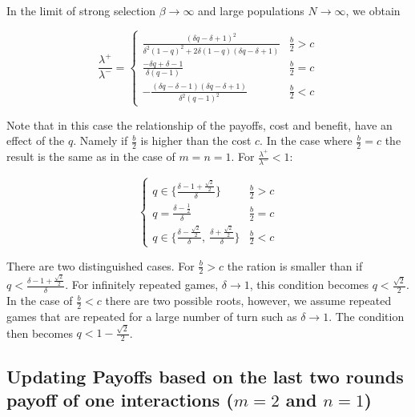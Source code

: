 \documentclass[11pt]{article}
\theoremstyle{plainCl1}
\theoremstyle{plainCl2}
\begin{document}
In the limit of strong selection \(\beta \rightarrow \infty\) and large
populations \(N \rightarrow \infty \), we obtain

\begin{equation}
\frac{\lambda^{+}}{\lambda^{-}} = 
\begin{cases}
  \frac{\left(\delta q - \delta + 1\right)^{2}}{\delta^{2} \left(1 - q\right)^{2} + 2 \delta \left(1 - q\right) \left(\delta q - \delta + 1\right)}  & \frac{b}{2} > c \\
  \frac{- \delta q + \delta - 1}{\delta \left(q - 1\right)}  & \frac{b}{2} = c \\
  - \frac{\left(\delta q - \delta - 1\right) \left(\delta q - \delta + 1\right)}{\delta^{2} \left(q - 1\right)^{2}} & \frac{b}{2} < c
\end{cases}
\end{equation}

Note that in this case the relationship of the payoffs, cost and benefit, have
an effect of the \(q\). Namely if \(\frac{b}{2}\) is higher than the cost \(c\).
In the case where \(\frac{b}{2}=c\) the result is the same as in the case
of \(m=n=1\). For \(\frac{\lambda^{+}}{\lambda^{-}} < 1\):

\begin{equation}
\begin{cases}
  q \in \{\frac{\delta - 1 + \frac{\sqrt{2}}{2}}{\delta}\}  & \frac{b}{2} > c \\
  q = \frac{\delta - \frac{1}{2}}{\delta}  & \frac{b}{2} = c \\
  q \in \{\frac{\delta - \frac{\sqrt{2}}{2}}{\delta}, \  \frac{\delta + \frac{\sqrt{2}}{2}}{\delta}\} & \frac{b}{2} < c
\end{cases}
\end{equation}


There are two distinguished cases. For \(\frac{b}{2}>c\) the ration is smaller
than if \(q < \frac{\delta - 1 + \frac{\sqrt{2}}{2}}{\delta}\). For infinitely
repeated games, \(\delta \rightarrow 1\), this condition becomes \(q <
\frac{\sqrt{2}}{2}\). In the case of \(\frac{b}{2}<c\) there are two possible
roots, however, we assume repeated games that are repeated for a large number
of turn such as \(\delta \rightarrow 1\). The condition then becomes
\(q < 1 - \frac{\sqrt{2}}{2}\).

\subsection{Updating Payoffs based on the last two rounds payoff of one interactions (\(m=2\) and \(n=1\))}\label{section:m_two_n_one}
\end{document}
